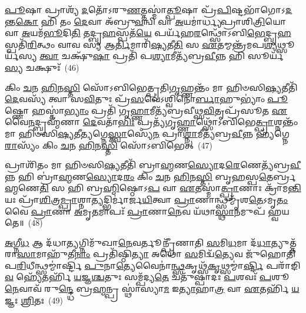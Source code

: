 \-\ul{𑌪𑍂}\-𑌷𑌾 𑌪𑍍𑌰𑌾𑌶𑍍𑌯᳴ \ul{𑌦}\-𑌤𑍋᳴\-𑌽𑌰𑍁\-\ul{𑌣}\-𑌤𑍍𑌤𑌸𑍍𑌮𑌾॑\-\ul{𑌤𑍍𑌪𑍂}\-𑌷𑌾 𑌪𑍍𑌰᳴\-\ul{𑌪𑌿}\-𑌷𑍍𑌟𑌭𑌾᳴𑌗𑍋\-𑌽\-\ul{𑌦}\-𑌨𑍍𑌤\-\ul{𑌕𑍋} 𑌹𑌿 𑌤𑌂 \ul{𑌦𑍇}\-𑌵𑌾 𑌅᳴𑌬𑍍𑌰𑍁\-\ul{𑌵}\-𑌨𑍍𑌵𑌿 𑌵𑌾 \ul{𑌅}\-𑌯𑌮𑌾॑𑌰𑍍𑌧𑍍𑌯𑌪𑍍𑌰𑌾𑌶𑌿\-\ul{𑌤𑍍𑌰𑌿}\-𑌯𑍋 𑌵𑌾 \ul{𑌅}\-𑌯𑌮᳴\-\ul{𑌭𑍂}\-𑌦𑌿\-\ul{𑌤𑌿} 𑌤𑌦𑍍𑌬𑍃\-\ul{𑌹}\-𑌸𑍍𑌪𑌤᳴\-\ul{𑌯𑍇} 𑌪𑌰𑍍𑌯᳴𑌹\-\ul{𑌰}\-𑌨𑍍𑌥𑍍𑌸𑍋᳴\-𑌽𑌬𑌿\-\ul{𑌭𑍇}\-𑌦𑍍𑌬𑍃\-\ul{𑌹}\-𑌸𑍍𑌪𑌤𑌿᳴\-\ul{𑌰𑌿}\-𑌤𑍍𑌥𑌂 𑌵𑌾𑌵 𑌸𑍍𑌯 𑌆\-\ul{𑌰𑍍𑌤𑌿}\-𑌮𑌾𑌰𑌿᳴\-\ul{𑌷𑍍𑌯}\-𑌤𑍀\-\ul{𑌤𑌿} 𑌸 \ul{𑌏}\-𑌤𑌮𑍍𑌮𑌨𑍍𑌤𑍍𑌰᳴𑌮𑌪\-\ul{𑌶𑍍𑌯}\-𑌥𑍍𑌸𑍂𑌰𑍍𑌯᳴𑌸𑍍𑌯 \ul{𑌤𑍍𑌵𑌾} 𑌚𑌕𑍍𑌷𑍁᳴\-\ul{𑌷𑌾} 𑌪𑍍𑌰𑌤𑌿᳴ 𑌪\-\ul{𑌶𑍍𑌯𑌾}\-𑌮𑍀𑌤𑍍𑌯᳴𑌬𑍍𑌰\-\ul{𑌵𑍀}\-𑌨𑍍𑌨 𑌹𑌿 𑌸𑍂𑌰𑍍𑌯᳴\-\ul{𑌸𑍍𑌯} 𑌚𑌕𑍍𑌷𑍁𑌃᳴~(46)

𑌕𑌿𑌂 \ul{𑌚}\-𑌨 \ul{𑌹𑌿}\-𑌨\-\ul{𑌸𑍍𑌤𑌿} 𑌸𑍋᳴\-𑌽𑌬𑌿𑌭𑍇𑌤𑍍𑌪𑍍𑌰𑌤𑌿\-\ul{𑌗𑍃}\-𑌹𑍍𑌣𑌨𑍍𑌤𑌂᳴ 𑌮𑌾 𑌹𑌿𑍞𑌸𑌿\-\ul{𑌷𑍍𑌯}\-𑌤𑍀𑌤𑌿᳴ \ul{𑌦𑍇}\-𑌵𑌸𑍍𑌯᳴ 𑌤𑍍𑌵𑌾 𑌸\-\ul{𑌵𑌿}\-𑌤𑍁𑌃 𑌪𑍍𑌰᳴\-\ul{𑌸}\-𑌵𑍇॑\-𑌽𑌶𑍍𑌵𑌿𑌨𑍋॑\-\ul{𑌰𑍍𑌬𑌾}\-𑌹𑍁\-𑌭𑍍𑌯𑌾𑌂॑ \ul{𑌪𑍂}\-𑌷𑍍𑌣𑍋 𑌹𑌸𑍍𑌤𑌾॑\-\ul{𑌭𑍍𑌯𑌾𑌂} 𑌪𑍍𑌰𑌤𑌿᳴ 𑌗𑍃\-\ul{𑌹𑍍𑌣𑌾}\-𑌮𑍀𑌤𑍍𑌯᳴𑌬𑍍𑌰𑌵𑍀𑌥𑍍𑌸\-\ul{𑌵𑌿}\-𑌤𑍃𑌪𑍍𑌰᳴𑌸𑍂𑌤 \ul{𑌏}\-𑌵𑍈\-\ul{𑌨}\-𑌦𑍍𑌬𑍍𑌰𑌹𑍍𑌮᳴𑌣𑌾 \ul{𑌦𑍇}\-𑌵𑌤𑌾᳴\-\ul{𑌭𑌿𑌃} 𑌪𑍍𑌰𑌤𑍍𑌯᳴𑌗𑍃\-\ul{𑌹𑍍𑌣𑌾}\-𑌥𑍍𑌸𑍋᳴\-𑌽𑌬𑌿𑌭𑍇\-\ul{𑌤𑍍𑌪𑍍𑌰𑌾}\-𑌶𑍍𑌨𑌨𑍍𑌤𑌂᳴ 𑌮𑌾 𑌹𑌿𑍞𑌸𑌿\-\ul{𑌷𑍍𑌯}\-𑌤𑍀\-\ul{𑌤𑍍𑌯}\-𑌗𑍍𑌨𑍇\-\ul{𑌸𑍍𑌤𑍍𑌵𑌾}\-𑌸𑍍𑌯𑍇᳴\-\ul{𑌨} 𑌪𑍍𑌰𑌾\-\ul{𑌶𑍍𑌨𑌾}\-𑌮𑍀𑌤𑍍𑌯᳴𑌬𑍍𑌰\-\ul{𑌵𑍀}\-𑌨𑍍𑌨 𑌹𑍍𑌯᳴𑌗𑍍𑌨𑍇\-\ul{𑌰𑌾}\-𑌸𑍍𑌯𑌂᳴ 𑌕𑌿𑌂 \ul{𑌚}\-𑌨 \ul{𑌹𑌿}\-𑌨\-\ul{𑌸𑍍𑌤𑌿} 𑌸𑍋᳴\-𑌽𑌬𑌿𑌭𑍇𑌤𑍍~(47)

𑌪𑍍𑌰𑌾𑌶𑌿᳴𑌤𑌂 𑌮𑌾 𑌹𑌿𑍞𑌸𑌿\-\ul{𑌷𑍍𑌯}\-𑌤𑍀𑌤𑌿᳴ 𑌬𑍍𑌰𑌾\-\ul{𑌹𑍍𑌮}\-𑌣\-\ul{𑌸𑍍𑌯𑍋}\-𑌦\-\ul{𑌰𑍇}\-𑌣𑍇𑌤𑍍𑌯᳴𑌬𑍍𑌰\-\ul{𑌵𑍀}\-𑌨𑍍𑌨 𑌹𑌿 𑌬𑍍𑌰𑌾॑\-\ul{𑌹𑍍𑌮}\-𑌣\-\ul{𑌸𑍍𑌯𑍋}\-𑌦\-\ul{𑌰𑌂} 𑌕𑌿𑌂 \ul{𑌚}\-𑌨 \ul{𑌹𑌿}\-𑌨\-\ul{𑌸𑍍𑌤𑌿} 𑌬𑍃\-\ul{𑌹}\-𑌸𑍍𑌪\-\ul{𑌤𑍇}\-𑌰𑍍𑌬𑍍𑌰\-\ul{𑌹𑍍𑌮}\-𑌣𑍇\-\ul{𑌤𑌿} 𑌸 𑌹𑌿 𑌬𑍍𑌰\-\ul{𑌹𑍍𑌮𑌿}\-𑌷𑍍𑌠𑍋\-𑌽\-\ul{𑌪} 𑌵𑌾 \ul{𑌏}\-𑌤𑌸𑍍𑌮𑌾॑\-\ul{𑌤𑍍𑌪𑍍𑌰𑌾}\-𑌣𑌾𑌃 𑌕𑍍𑌰𑌾᳴𑌮\-\ul{𑌨𑍍𑌤𑌿} 𑌯𑌃 𑌪𑍍𑌰𑌾᳴\-\ul{𑌶𑌿}\-𑌤𑍍𑌰\-\ul{𑌮𑍍𑌪𑍍𑌰𑌾}\-𑌶𑍍𑌨𑌾\-\ul{𑌤𑍍𑌯}\-𑌦𑍍𑌭𑌿𑌰𑍍𑌮𑌾॑𑌰𑍍𑌜\-\ul{𑌯𑌿}\-𑌤𑍍𑌵𑌾 \ul{𑌪𑍍𑌰𑌾}\-𑌣𑌾𑌨𑍍𑌥𑍍𑌸𑌮𑍍𑌮𑍃᳴𑌶\-\ul{𑌤𑍇}\-\-𑌽𑌮𑍃\-\ul{𑌤𑌂} 𑌵𑍈 \ul{𑌪𑍍𑌰𑌾}\-𑌣𑌾 \ul{𑌅}\-𑌮𑍃\-\ul{𑌤}\-𑌮𑌾𑌪𑌃᳴ \ul{𑌪𑍍𑌰𑌾}\-𑌣𑌾\-\ul{𑌨𑍇}\-𑌵 𑌯᳴𑌥𑌾\-\ul{𑌸𑍍𑌥𑌾}\-𑌨𑌮𑍁𑌪᳴ 𑌹𑍍𑌵𑌯𑌤𑍇॥~(48)

{\anuvakamend[{\-\ul{𑌪𑍍𑌰𑌾}\-\-\ul{𑌶𑍍𑌞𑍀}\-𑌯𑌾𑌦𑍍𑌧𑍋𑌤𑌾᳴ \ul{𑌯}\-𑌜𑍍𑌞𑌂 𑌨𑌿𑌰᳴𑌹\-\ul{𑌰}\-𑌨𑍍𑌤𑌚𑍍𑌚𑌕𑍍𑌷𑍁᳴\-\ul{𑌰𑌾}\-𑌸𑍍𑌯᳴𑌙𑍍𑌕𑌿𑌂 \ul{𑌚}\-𑌨 \ul{𑌹𑌿}\-𑌨\-\ul{𑌸𑍍𑌤𑌿} 𑌸𑍋᳴\-𑌽𑌬𑌿\-\ul{𑌭𑍇}\-𑌚𑍍𑌚𑌤𑍁᳴𑌶𑍍𑌚𑌤𑍍𑌵𑌾𑌰𑌿𑍞𑌶𑌚𑍍𑌚}]}%

\-\ul{𑌅}\-𑌗𑍍𑌨𑍀\-\ul{𑌧} 𑌆 𑌦᳴𑌧𑌾\-\ul{𑌤𑍍𑌯}\-𑌗𑍍𑌨𑌿𑌮𑍁᳴𑌖𑌾\-\ul{𑌨𑍇}\-𑌵𑌰𑍍𑌤𑍂𑌨𑍍𑌪𑍍𑌰𑍀᳴𑌣𑌾𑌤𑌿 \ul{𑌸}\-𑌮𑌿\-\ul{𑌧}\-𑌮𑌾 𑌦᳴\-\ul{𑌧𑌾}\-𑌤𑍍𑌯𑍁𑌤𑍍𑌤᳴𑌰𑌾\-\ul{𑌸𑌾}\-𑌮𑌾𑌹𑍁᳴𑌤𑍀\-\ul{𑌨𑌾𑌂} 𑌪𑍍𑌰𑌤𑌿᳴𑌷𑍍𑌠𑌿\-\ul{𑌤𑍍𑌯𑌾} 𑌅𑌥𑍋᳴ \ul{𑌸}\-𑌮𑌿𑌦𑍍𑌵᳴\-\ul{𑌤𑍍𑌯𑍇}\-𑌵 𑌜𑍁᳴𑌹𑍋𑌤𑌿 𑌪\-\ul{𑌰𑌿}\-𑌧𑍀𑌨𑍍𑌥𑍍𑌸𑌮𑍍𑌮𑌾॑𑌰𑍍𑌷𑍍𑌟𑌿 \ul{𑌪𑍁}\-𑌨𑌾\-\ul{𑌤𑍍𑌯𑍇}\-𑌵𑍈𑌨𑌾॑\-\ul{𑌨𑍍𑌥𑍍𑌸}\-𑌕𑍃𑌥𑍍𑌸᳴\-\ul{𑌕𑍃}\-𑌥𑍍𑌸𑌮𑍍𑌮𑌾॑\-\ul{𑌰𑍍𑌷𑍍𑌟𑌿} 𑌪𑌰𑌾᳴𑌙𑌿\-\ul{𑌵} 𑌹𑍍𑌯𑍇᳴𑌤𑌰𑍍\mbox{}𑌹𑌿᳴ \ul{𑌯}\-𑌜𑍍𑌞\-\ul{𑌶𑍍𑌚}\-𑌤𑍁𑌃 𑌸𑌮𑍍𑌪᳴𑌦𑍍𑌯\-\ul{𑌤𑍇} 𑌚𑌤𑍁᳴𑌷𑍍𑌪𑌾𑌦𑌃 \ul{𑌪}\-𑌶𑌵𑌃᳴ \ul{𑌪}\-𑌶𑍂\-\ul{𑌨𑍇}\-𑌵𑌾𑌵᳴ 𑌰𑍁\-\ul{𑌨𑍍𑌦𑍍𑌧𑍇} 𑌬𑍍𑌰\-\ul{𑌹𑍍𑌮}\-𑌨𑍍𑌪𑍍𑌰 𑌸𑍍𑌥𑌾॑𑌸𑍍𑌯𑌾\-\ul{𑌮} 𑌇\-\ul{𑌤𑍍𑌯𑌾}\-𑌹𑌾\-\ul{𑌤𑍍𑌰} 𑌵𑌾 \ul{𑌏}\-𑌤𑌰𑍍\mbox{}𑌹𑌿᳴ \ul{𑌯}\-𑌜𑍍𑌞𑌃 \ul{𑌶𑍍𑌰𑌿}\-𑌤𑌃~(49)

